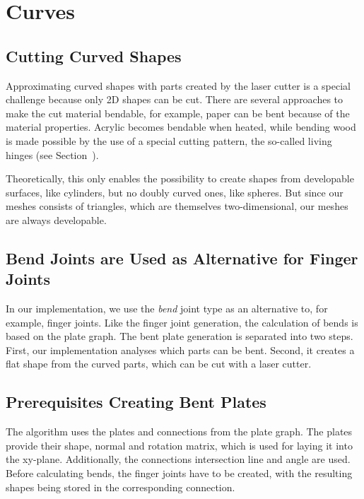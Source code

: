 \documentclass[../ClassicThesis.tex]{subfiles}
\begin{document}
\chapter{Curves}\label{ch:curves}

\section{Cutting Curved Shapes}

Approximating curved shapes with parts created by the laser cutter is a special challenge because only 2D shapes can be cut. There are several approaches to make the cut material bendable, for example, paper can be bent because of the material properties. Acrylic becomes bendable when heated, while bending wood is made possible by the use of a special cutting pattern, the so-called living hinges (see Section~).

Theoretically, this only enables the possibility to create shapes from developable surfaces, like cylinders, but no doubly curved ones, like spheres. But since our meshes consists of triangles, which are themselves two-dimensional, our meshes are always developable.

\section{Bend Joints are Used as Alternative for Finger Joints}

In our implementation, we use the \emph{bend} joint type as an alternative to, for example, finger joints. Like the finger joint generation, the calculation of bends is based on the plate graph. The bent plate generation is separated into two steps. First, our implementation analyses which parts can be bent. Second, it creates a flat shape from the curved parts, which can be cut with a laser cutter. 

\section{Prerequisites Creating Bent Plates}

The algorithm uses the plates and connections from the plate graph. The plates provide their shape, normal and rotation matrix, which is used for laying it into the xy-plane. Additionally, the connections intersection line and angle are used. Before calculating bends, the finger joints have to be created, with the resulting shapes being stored in the corresponding connection.
\end{document}
